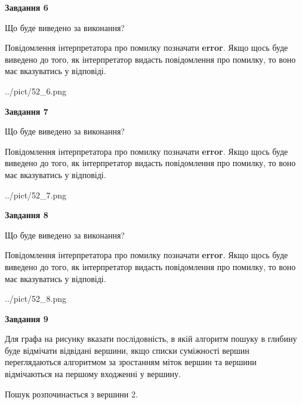 \documentclass[12pt, ukrainian]{article}
\begin{document}
{\begin {large}
{\begin {center}\textbf{Завдання 6}\end {center}}\par
Що буде виведено за виконання?

Повідомлення інтерпретатора про помилку позначати \textbf{error}.
Якщо щось буде виведено до того, як інтерпретатор видасть повідомлення про помилку, 
то воно має вказуватись у відповіді. \par


\begin{center}
	{../pict/52_6.png}
\end{center}
\newpage

{\begin {center}\textbf{Завдання 7}\end {center}}\par
Що буде виведено за виконання?

Повідомлення інтерпретатора про помилку позначати \textbf{error}.
Якщо щось буде виведено до того, як інтерпретатор видасть повідомлення про помилку, 
то воно має вказуватись у відповіді. \par


\begin{center}
	{../pict/52_7.png}
\end{center}
\newpage

{\begin {center}\textbf{Завдання 8}\end {center}}\par
Що буде виведено за виконання?

Повідомлення інтерпретатора про помилку позначати \textbf{error}.
Якщо щось буде виведено до того, як інтерпретатор видасть повідомлення про помилку, 
то воно має вказуватись у відповіді. \par


\begin{center}
	{../pict/52_8.png}
\end{center}
\newpage

{\begin {center}\textbf{Завдання 9}\end {center}}\par
Для графа на рисунку вказати послідовність, в якій алгоритм пошуку в глибину буде відмічати відвідані вершини, якщо списки суміжності вершин переглядаються алгоритмом за зростанням міток вершин та вершини відмічаються на першому вход\-женні у вершину.\par
Пошук розпочинається з вершини 2.\par


\end{large}}
\end{document}
